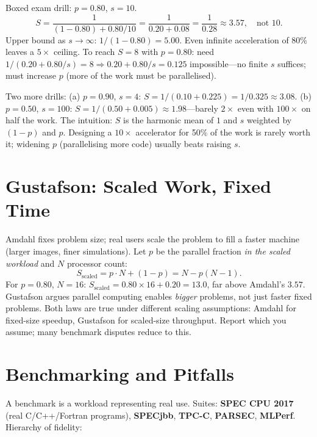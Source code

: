 Boxed exam drill: $p=0.80$, $s=10$.
\[ S = \frac{1}{(1-0.80)+0.80/10}=\frac{1}{0.20+0.08}=\frac{1}{0.28}\approx\boxed{3.57},\quad\text{not }10. \]
Upper bound as $s\to\infty$: $1/(1-0.80)=5.00$. Even infinite acceleration of 80\% leaves a $5\times$ ceiling. To reach $S=8$ with $p=0.80$: need $1/(0.20+0.80/s)=8\Rightarrow0.20+0.80/s=0.125$ impossible---no finite $s$ suffices; must increase $p$ (more of the work must be parallelised).

Two more drills: (a) $p=0.90$, $s=4$: $S=1/(0.10+0.225)=1/0.325\approx3.08$. (b) $p=0.50$, $s=100$: $S=1/(0.50+0.005)\approx1.98$---barely $2\times$ even with $100\times$ on half the work. The intuition: $S$ is the harmonic mean of $1$ and $s$ weighted by $(1-p)$ and $p$. Designing a $10\times$ accelerator for 50\% of the work is rarely worth it; widening $p$ (parallelising more code) usually beats raising $s$.

\section{Gustafson: Scaled Work, Fixed Time}
Amdahl fixes problem size; real users scale the problem to fill a faster machine (larger images, finer simulations). Let $p$ be the parallel fraction \emph{in the scaled workload} and $N$ processor count:
\[ S_{\text{scaled}} = p\cdot N + (1-p) = N - p(N-1). \]
For $p=0.80$, $N=16$: $S_{\text{scaled}}=0.80\times16+0.20=13.0$, far above Amdahl's $3.57$. Gustafson argues parallel computing enables \emph{bigger} problems, not just faster fixed problems. Both laws are true under different scaling assumptions: Amdahl for fixed-size speedup, Gustafson for scaled-size throughput. Report which you assume; many benchmark disputes reduce to this.

\section{Benchmarking and Pitfalls}
A benchmark is a workload representing real use. Suites: \textbf{SPEC CPU 2017} (real C/C++/Fortran programs), \textbf{SPECjbb}, \textbf{TPC-C}, \textbf{PARSEC}, \textbf{MLPerf}. Hierarchy of fidelity:

